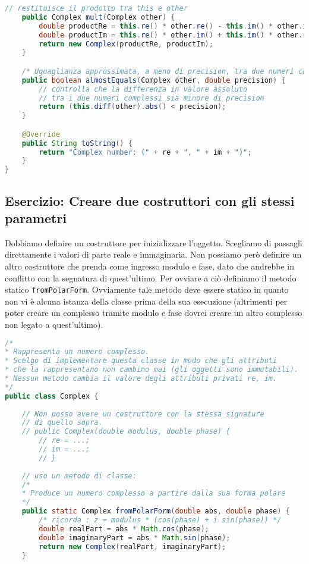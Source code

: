 \documentclass{article}
\begin{document}
\begin{lstlisting}[language=Java,escapechar=|]
    // restituisce il prodotto tra this e other
    public Complex mult(Complex other) {
	    double productRe = this.re() * other.re() - this.im() * other.im();
	    double productIm = this.re() * other.im() + this.im() * other.re();
	    return new Complex(productRe, productIm);
    }

    /* Uguaglianza approssimata, a meno di precision, tra due numeri complessi Riguardo all'operazione di uguaglianza tra complessi non e' consigliabile utilizzare l'operatore ==, poiche' in tal modo basterebbe un errore di arrotondamento per far risultare due numeri diversi. Per ovviare a cio' si utilizza un parametro  che indica la tolleranza da adottare.*/
    public boolean almostEquals(Complex other, double precision) {
    	// controlla che la differenza in valore assoluto
	    // tra i due numeri complessi sia minore di precision
	    return (this.diff(other).abs() < precision);
    }

    @Override
    public String toString() {
	    return "Complex number: (" + re + ", " + im + ")";
    }
}
\end{lstlisting}






\subsection{Esercizio: Creare due costruttori con gli stessi parametri}

Dobbiamo definire un costruttore per inizializzare l'oggetto.
Scegliamo di passagli direttamente i valori di parte reale e immaginaria.
Non possiamo per\`o definire un altro costruttore che prenda come ingresso
modulo e fase, dato che andrebbe in conflitto con la segnatura di quest'ultimo.
Per ovviare a ciò definiamo il metodo statico \texttt{fromPolarForm}.
Ovviamente tale metodo deve essere statico in quanto non vi è
alcuna istanza della classe prima della sua esecuzione (altrimenti
per poter creare un complesso tramite modulo e fase dovrei creare un altro complesso
non legato a quest'ultimo).
\begin{lstlisting}[language=Java,escapechar=|]
/*
* Rappresenta un numero complesso.
* Scelgo di implementare questa classe in modo che gli attributi
* che la rappresentano non cambino mai (gli oggetti sono immutabili).
* Nessun metodo cambia il valore degli attributi privati re, im.
*/
public class Complex {
	
	// Non posso avere un costruttore con la stessa signature
	// di quello sopra.
	// public Complex(double modulus, double phase) {
		// re = ...;
		// im = ...;
		// }
	
	// uso un metodo di classe:
	/*
	* Produce un numero complesso a partire dalla sua forma polare
	*/
	public static Complex fromPolarForm(double abs, double phase) {
		/* ricorda : z = modulus * (cos(phase) + i sin(phase)) */
		double realPart = abs * Math.cos(phase);
		double imaginaryPart = abs * Math.sin(phase);
		return new Complex(realPart, imaginaryPart);
	}
\end{lstlisting}
\end{document}
